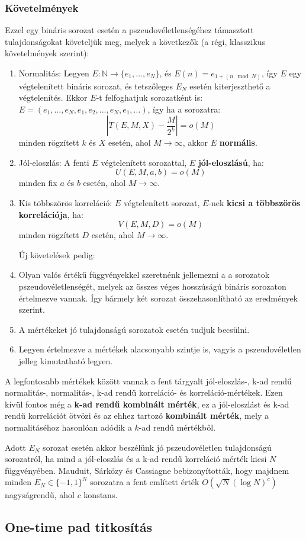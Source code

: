 \documentclass[12pt]{article}
\begin{document}
	\subsubsection*{Követelmények}
	Ezzel egy bináris sorozat esetén a pszeudovéletlenségéhez támasztott tulajdonságokat követeljük meg, melyek a következők (a régi, klasszikus követelmények szerint):
	\begin{enumerate}
		\bfseries \item Normalitás:
		\normalfont	Legyen $E: \mathbb{N} \to \{e_1, ..., e_N\}$, és $E(n) = e_{1+(n \mod N)}$, így $E$ egy végtelenített bináris sorozat, és tetszőleges $E_N$ esetén kiterjeszthető a végtelenítés. Ekkor $E$-t felfoghatjuk sorozatként is: $E=(e_1, ..., e_N, e_1, e_2, ..., e_N, e_1, ...)$, így ha a sorozatra:
		$$\left|T(E, M, X) - \frac{M}{2^k}\right| = o(M)$$
		minden rögzített $k$ és $X$ esetén, ahol $M \to \infty$, akkor $E$ \textbf{normális}.
		\par
		\bfseries \item Jól-eloszlás:
		\normalfont A fenti $E$ végtelenített sorozattal, $E$ \textbf{jól-eloszlású}, ha:
		$$U(E, M, a, b) = o (M)$$
		minden fix $a$ és $b$ esetén, ahol $M \to \infty$.
		\bfseries \item Kis többszörös korreláció:
		\normalfont $E$ végtelenített sorozat, $E$-nek \textbf{kicsi a többszörös korrelációja}, ha:
		$$V(E, M, D) = o(M)$$
		minden rögzített $D$ esetén, ahol $M \to \infty$. \par
		Új követelések pedig:
		\item Olyan valós értékű függvényekkel szeretnénk jellemezni a a sorozatok pszeudovéletlenségét, melyek az összes véges hosszúságú bináris sorozaton értelmezve vannak. Így bármely két sorozat összehasonlítható az eredmények szerint.
		\item A mértékeket jó tulajdonságú sorozatok esetén tudjuk becsülni.
		\item Legyen értelmezve a mértékek alacsonyabb szintje is, vagyis a pszeudovéletlen jelleg kimutatható legyen. 
	\end{enumerate}
	A legfontosabb mértékek között vannak a fent tárgyalt jól-eloszlás-, k-ad rendű normalitás-, normalitás-, k-ad rendű korreláció- és korreláció-mértékek. Ezen kívül fontos még a \textbf{k-ad rendű kombinált mérték}, ez a jól-eloszlást és k-ad rendű korrelációt ötvözi és az ehhez tartozó \textbf{kombinált mérték}, mely a normalitáséhoz hasonlóan adódik a $k$-ad rendű mértékből.
	
	Adott $E_N$ sorozat esetén akkor beszélünk jó pszeudovéletlen tulajdonságú sorozatról, ha mind a jól-eloszlás és a k-ad rendű korreláció mérték kicsi $N$ függvényében. Mauduit, Sárközy és Cassiagne bebizonyították, hogy majdnem minden $E_N \in \{-1, 1\}^N$ sorozatra a fent említett érték $O(\sqrt{N}(\log{N})^c)$ nagyságrendű, ahol $c$ konstans.
	\subsection{One-time pad titkosítás}
	
\end{document}
